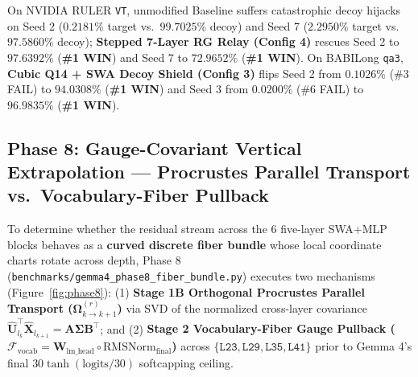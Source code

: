 \documentclass[11pt,letterpaper]{article}
\begin{document}
On NVIDIA RULER \texttt{VT}, unmodified Baseline suffers catastrophic decoy hijacks on Seed 2 ($0.2181\%$ target vs.\ $99.7025\%$ decoy) and Seed 7 ($2.2950\%$ target vs.\ $97.5860\%$ decoy); \textbf{Stepped 7-Layer RG Relay (Config 4)} rescues Seed 2 to $\mathbf{97.6392\%}$ (\textbf{\#1 WIN}) and Seed 7 to $\mathbf{72.9652\%}$ (\textbf{\#1 WIN}). On BABILong \texttt{qa3}, \textbf{Cubic Q14 + SWA Decoy Shield (Config 3)} flips Seed 2 from $0.1026\%$ (\#3 FAIL) to $\mathbf{94.0308\%}$ (\textbf{\#1 WIN}) and Seed 3 from $0.0200\%$ (\#6 FAIL) to $\mathbf{96.9835\%}$ (\textbf{\#1 WIN}).

\begin{table}[!htbp]
\centering
\caption{Phase 7B ``Lost in the Middle'' Multi-Document Depth Sweep ($15\%$ to $75\%$ Document Depth).}
\label{tab:phase7b}
\vspace{2pt}
\end{table}

\subsection*{Phase 8: Gauge-Covariant Vertical Extrapolation --- Procrustes Parallel Transport vs.\ Vocabulary-Fiber Pullback}

To determine whether the residual stream across the 6 five-layer SWA+MLP blocks behaves as a \textbf{curved discrete fiber bundle} whose local coordinate charts rotate across depth, Phase 8 (\texttt{benchmarks/gemma4\_phase8\_fiber\_bundle.py}) executes two mechanisms (Figure~\ref{fig:phase8}): (1) \textbf{Stage 1B Orthogonal Procrustes Parallel Transport ($\mathbf{\Omega}_{k \to k+1}^{(r)}$)} via SVD of the normalized cross-layer covariance $\hat{\mathbf{U}}_{l_k}^\top \hat{\mathbf{X}}_{l_{k+1}} = \mathbf{A}\mathbf{\Sigma}\mathbf{B}^\top$; and (2) \textbf{Stage 2 Vocabulary-Fiber Gauge Pullback ($\mathcal{F}_{\text{vocab}} = \mathbf{W}_{\text{lm\_head}} \circ \text{RMSNorm}_{\text{final}}$)} across $\{\texttt{L23}, \texttt{L29}, \texttt{L35}, \texttt{L41}\}$ prior to Gemma 4's final $30 \tanh(\text{logits}/30)$ softcapping ceiling.
\end{document}
